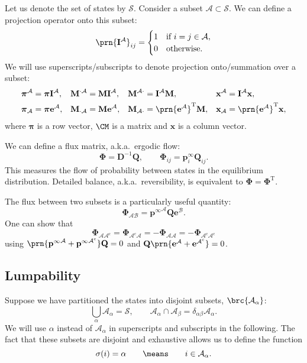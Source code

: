 \documentclass{article} %
\newcommand{\inv}{^{-1}}
\newcommand{\trans}{^\mathrm{T}}
\newcommand{\I}{\mathbf{I}}
\newcommand{\onev}{\mathbf{e}}
\newcommand{\MM}{\mathbf{Q}}
\newcommand{\pr}{\mathbf{p}}
\newcommand{\eq}{\pr^\infty}
\newcommand{\D}{\mathbf{D}}
\newcommand{\pib}{\boldsymbol{\pi}}
\newcommand{\M}{\mathbf{M}}
\newcommand{\F}{\boldsymbol{\Phi}}
\newcommand{\CS}{\mathcal{S}}
\newcommand{\CA}{\mathcal{A}}
\newcommand{\CB}{\mathcal{B}}
\newcommand{\comp}{^\mathrm{c}}
\begin{document}
Let us denote the set of states by $\CS$.
Consider a subset $\CA\subset\CS$.
We can define a projection operator onto this subset:
%
\begin{equation}\label{eq:proj}
  \prn{\I^\CA}_{ij} =
    \begin{cases}
      1 &\text{if $i=j\in\CA$,}\\
      0 &\text{otherwise.}
    \end{cases}
\end{equation}
%
We will use superscripts/subscripts to denote projection onto/summation over a subset:
%
\begin{equation}\label{eq:projsum}
  \begin{aligned}
    \pib^\CA &=\pib\I^\CA, &
    \M^{\cdot\CA}&=\M\I^\CA, &
    \M^{\CA\cdot}&=\I^\CA\M, &
    \mathbf{x}^\CA &= \I^\CA\mathbf{x},
    \\
    \pib_\CA &=\pib\onev^\CA, &
    \M_{\cdot\CA}&=\M\onev^\CA, &
    \M_{\CA\cdot}&=\prn{\onev^\CA}\trans\M, &
    \mathbf{x}_\CA &= \prn{\onev^\CA}\trans\mathbf{x},
  \end{aligned}
\end{equation}
%
where $\pib$ is a row vector, $\CM$ is a matrix and $\mathbf{x}$ is a column vector.

We can define a flux matrix, a.k.a.\ ergodic flow:
%
\begin{equation}\label{eq:flux}
  \F = \D\inv\MM,
  \qquad
  \F_{ij} = \eq_i \MM_{ij}.
\end{equation}
%
This measures the flow of probability between states in the equilibrium distribution.
Detailed balance, a.k.a.\ reversibility, is equivalent to $\F=\F\trans$.

The flux between two subsets is a particularly useful quantity:
%
\begin{equation}\label{eq:subflux}
  \F_{\CA\CB} = {\eq}^\CA\MM\onev^\CB.
\end{equation}
%
One can show that
%
\begin{equation}\label{eq:compflux}
  \F_{\CA\CA\comp} = \F_{\CA\comp\CA} = -\F_{\CA\CA} = -\F_{\CA\comp\CA\comp}
\end{equation}
%
using $\prn{{\eq}^\CA + {\eq}^{\CA\comp}}\MM=0$ and $\MM\prn{{\onev}^\CA + {\onev}^{\CA\comp}}=0$.

\subsection{Lumpability}\label{sec:lump}

Suppose we have partitioned the states into disjoint subsets, $\brc{\CA_\alpha}$:
%
\begin{equation}\label{eq:partition}
  \bigcup_\alpha \CA_\alpha = \CS,
  \qquad
  \CA_\alpha \cap \CA_\beta = \delta_{\alpha\beta}\CA_\alpha.
\end{equation}
%
We will use $\alpha$ instead of $\CA_\alpha$ in superscripts and subscripts in the following.
The fact that these subsets are disjoint and exhaustive allows us to define the function
%
\begin{equation}\label{eq:whichsey}
  \sigma(i)=\alpha
  \qquad\means\qquad
  i\in\CA_\alpha.
\end{equation}
%
\end{document}
